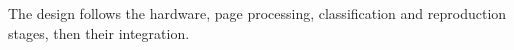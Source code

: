 \label{sec:design}
The design follows the hardware, page processing, classification and reproduction stages, then their integration.








